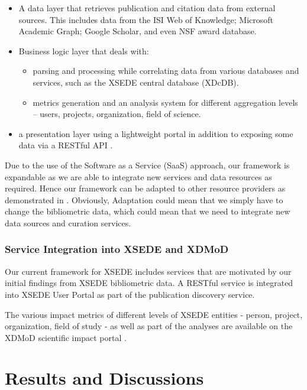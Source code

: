 \documentclass{sig-alternate}
\begin{document}
\begin{itemize}
\item A data layer that retrieves publication and citation data from external sources.
This includes data from the ISI Web of Knowledge;
Microsoft Academic Graph; Google Scholar, and even NSF award database.
\item Business logic layer that deals with:
\begin{itemize}
\item parsing and processing while correlating data from various databases
and services, such as the XSEDE central database (XDcDB).
\item metrics generation and an analysis system for different aggregation
levels -- users, projects, organization, field of science.
\end{itemize}
\item a presentation layer using a lightweight portal in addition to exposing
some data via a RESTful API \cite{Wang:2014:TSI:2616498.2616507}.
\end{itemize}

Due to the use of the Software as a Service (SaaS) approach, our framework is
expandable as we are able to integrate new services and data resources
as required. Hence our framework can be adapted to other resource providers
as demonstrated in \cite{tas2015}. Obviously, Adaptation could mean
that we simply have to change the bibliometric data, which could mean that
we need to integrate new data sources and curation services.

\subsubsection{Service Integration into XSEDE and XDMoD}

Our current framework for XSEDE includes services that are motivated by our
initial findings from XSEDE bibliometric data. A RESTful service is integrated
into XSEDE User Portal as part of the publication discovery service.

The various impact metrics of different levels of XSEDE entities - person, project,
organization, field of study - as well as part of the analyses are available on
the XDMoD scientific impact portal \cite{www-xdmod-sciimp}.

\section{Results and Discussions} \label{S:result}
\end{document}
